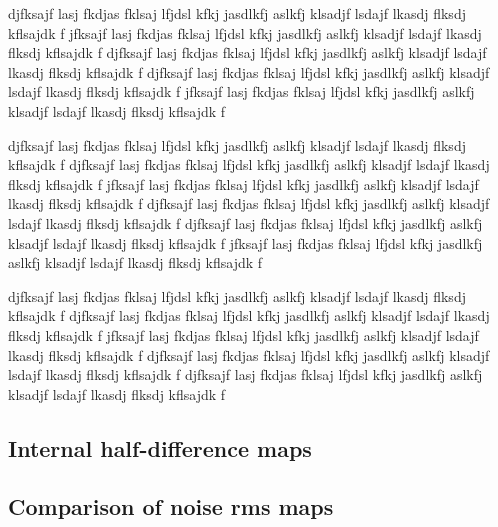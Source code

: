 \documentclass[twocolumn]{../../common/aa}
\begin{document}
djfksajf lasj fkdjas fklsaj lfjdsl kfkj jasdlkfj aslkfj klsadjf lsdajf lkasdj flksdj kflsajdk f
jfksajf lasj fkdjas fklsaj lfjdsl kfkj jasdlkfj aslkfj klsadjf lsdajf lkasdj flksdj kflsajdk f
djfksajf lasj fkdjas fklsaj lfjdsl kfkj jasdlkfj aslkfj klsadjf lsdajf lkasdj flksdj kflsajdk f
djfksajf lasj fkdjas fklsaj lfjdsl kfkj jasdlkfj aslkfj klsadjf lsdajf lkasdj flksdj kflsajdk f
jfksajf lasj fkdjas fklsaj lfjdsl kfkj jasdlkfj aslkfj klsadjf lsdajf lkasdj flksdj kflsajdk f

djfksajf lasj fkdjas fklsaj lfjdsl kfkj jasdlkfj aslkfj klsadjf lsdajf lkasdj flksdj kflsajdk f
djfksajf lasj fkdjas fklsaj lfjdsl kfkj jasdlkfj aslkfj klsadjf lsdajf lkasdj flksdj kflsajdk f
jfksajf lasj fkdjas fklsaj lfjdsl kfkj jasdlkfj aslkfj klsadjf lsdajf lkasdj flksdj kflsajdk f
djfksajf lasj fkdjas fklsaj lfjdsl kfkj jasdlkfj aslkfj klsadjf lsdajf lkasdj flksdj kflsajdk f
djfksajf lasj fkdjas fklsaj lfjdsl kfkj jasdlkfj aslkfj klsadjf lsdajf lkasdj flksdj kflsajdk f
jfksajf lasj fkdjas fklsaj lfjdsl kfkj jasdlkfj aslkfj klsadjf lsdajf lkasdj flksdj kflsajdk f

djfksajf lasj fkdjas fklsaj lfjdsl kfkj jasdlkfj aslkfj klsadjf lsdajf lkasdj flksdj kflsajdk f
djfksajf lasj fkdjas fklsaj lfjdsl kfkj jasdlkfj aslkfj klsadjf lsdajf lkasdj flksdj kflsajdk f
jfksajf lasj fkdjas fklsaj lfjdsl kfkj jasdlkfj aslkfj klsadjf lsdajf lkasdj flksdj kflsajdk f
djfksajf lasj fkdjas fklsaj lfjdsl kfkj jasdlkfj aslkfj klsadjf lsdajf lkasdj flksdj kflsajdk f
djfksajf lasj fkdjas fklsaj lfjdsl kfkj jasdlkfj aslkfj klsadjf lsdajf lkasdj flksdj kflsajdk f

\subsection{Internal half-difference maps}

\subsection{Comparison of noise rms maps}
\end{document}
